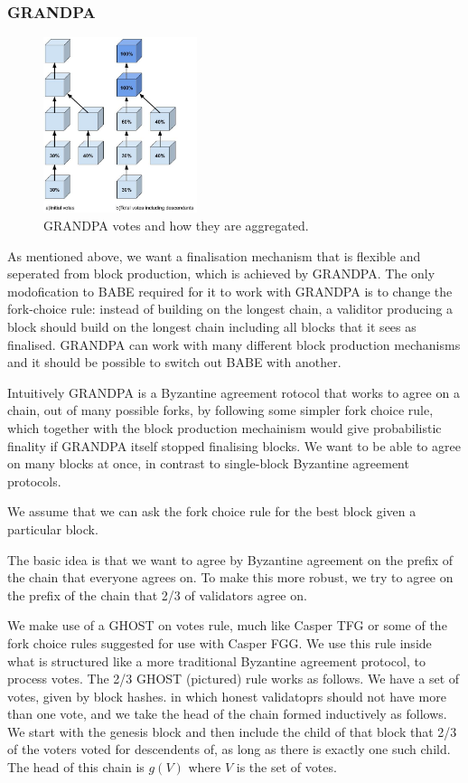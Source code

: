 \subsubsection{GRANDPA} \label{sec:grandpa}
\begin{figure}[h!]
  \centering
  \includegraphics[width=0.4\textwidth]{images/Grandpa.jpg}
  \caption{GRANDPA votes and how they are aggregated. }
    \label{fig:grandpa}
\end{figure}

As mentioned above, we want a finalisation mechanism that is flexible and seperated from block production, which is achieved by GRANDPA. The only modofication to BABE required for it to work with GRANDPA is to change the fork-choice rule: instead of building on the longest chain, a validitor producing a block should build on the longest chain including all blocks that it sees as finalised. GRANDPA can work with many different block production mechanisms and it should be possible to switch out BABE with another.

Intuitively GRANDPA is a Byzantine agreement rotocol that works to agree on a chain, out of many possible forks, by following some simpler fork choice rule, which together with the block production mechainism would give probabilistic finality if GRANDPA itself stopped finalising blocks. We want to be able to agree on many blocks at once, in contrast to single-block Byzantine agreement protocols.

We assume that we can ask the fork choice rule for the best block given a particular block. 

The basic idea is that we want to agree by Byzantine agreement on the prefix of the chain that everyone agrees on. To make this more robust, we try to agree on the prefix of the chain that 2/3 of validators agree on.

We make use of a GHOST on votes rule, much like Casper TFG or some of the fork choice rules suggested for use with Casper FGG. We use this rule inside what is structured like a more traditional Byzantine agreement protocol, to process votes. The 2/3 GHOST (pictured) rule works as follows. We have a set of votes, given by block hashes.  in which honest validatoprs should not have more than one vote, and we take the head of the chain formed inductively as follows. We start with the genesis block and then include the child of that block that 2/3 of the voters voted for descendents of, as long as there is exactly one such child. The head of this chain is $g(V)$ where $V$ is the set of votes.
